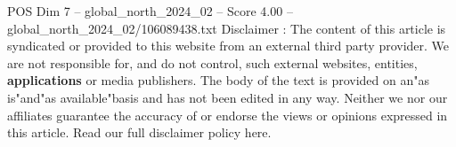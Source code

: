 \begin{textsample}{POS Dim 7 – global\_north\_2024\_02 – Score 4.00 – global\_north\_2024\_02/106089438.txt}
Disclaimer : The content of this article is syndicated or provided to this website from an external third party provider.
We are not responsible for, and do not control, such external websites, entities, \textbf{applications} or media publishers.
The body of the text is provided on an"as is"and"as available"basis and has not been edited in any way.
Neither we nor our affiliates guarantee the accuracy of or endorse the views or opinions expressed in this article.
Read our full disclaimer policy here.

\end{textsample}
